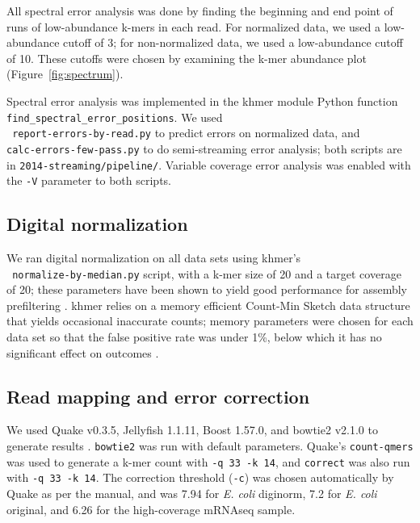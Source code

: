 \documentclass{article}
\begin{document}
All spectral error analysis was done by finding the beginning and end
point of runs of low-abundance k-mers in each read.  For normalized
data, we used a low-abundance cutoff of 3; for non-normalized data, we
used a low-abundance cutoff of 10.  These cutoffs were chosen by
examining the k-mer abundance plot (Figure~\ref{fig:spectrum}).

Spectral error analysis was implemented in the khmer module Python
function {\tt find\_spectral\_error\_positions}. We used\\ {\tt
  report-errors-by-read.py} to predict errors on normalized data, and
\\{\tt calc-errors-few-pass.py} to do semi-streaming error analysis;
both scripts are in {\tt 2014-streaming/pipeline/}.  Variable coverage
error analysis was enabled with the {\tt -V} parameter to both scripts.

\subsection{Digital normalization}

We ran digital normalization on all data sets using khmer's \\{\tt
  normalize-by-median.py} script, with a k-mer size of 20 and a target
coverage of 20; these parameters have been shown to yield good
performance for assembly prefiltering \cite{Brown2012,Lowe2015}.
khmer relies on a memory efficient Count-Min Sketch data structure
that yields occasional inaccurate counts; memory parameters were
chosen for each data set so that the false positive rate was under
1\%, below which it has no significant effect on outcomes
\cite{Zhang2014}.

\subsection{Read mapping and error correction}

We used Quake v0.3.5, Jellyfish 1.1.11, Boost 1.57.0, and bowtie2
v2.1.0 to generate results \cite{quake,jellyfish,schaling2011boost,bowtie2}. {\tt bowtie2} was run with
default parameters.  Quake's {\tt count-qmers} was used to generate a
k-mer count with {\tt -q 33 -k 14}, and {\tt correct} was also run
with {\tt -q 33 -k 14}.  The correction threshold ({\tt -c}) was
chosen automatically by Quake as per the manual, and was 7.94 for {\em
  E. coli} diginorm, 7.2 for {\em E. coli} original, and 6.26 for
the high-coverage mRNAseq sample.
\end{document}
